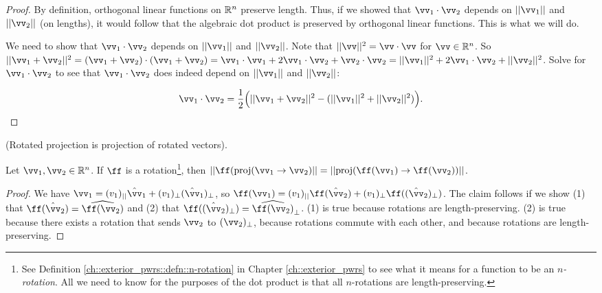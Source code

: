 \begin{proof}
    By definition, orthogonal linear functions on $\mathbb{R}^n$ preserve length. Thus, if we showed that  $\vv_1 \cdot \vv_2$ depends on $||\vv_1||$ and $||\vv_2||$ (on lengths), it would follow that the algebraic dot product is preserved by orthogonal linear functions. This is what we will do.

    We need to show that $\vv_1 \cdot \vv_2$ depends on $||\vv_1||$ and $||\vv_2||$. Note that $||\vv||^2 = \vv \cdot \vv$ for $\vv \in \R^n$. So \\ $||\vv_1 + \vv_2||^2 = (\vv_1 + \vv_2) \cdot (\vv_1 + \vv_2) = \vv_1 \cdot \vv_1 + 2 \vv_1 \cdot \vv_2 + \vv_2 \cdot \vv_2 = ||\vv_1||^2 + 2 \vv_1 \cdot \vv_2 + ||\vv_2||^2$. Solve for $\vv_1 \cdot \vv_2$ to see that $\vv_1 \cdot \vv_2$ does indeed depend on $||\vv_1||$ and $||\vv_2||$:
    
   \begin{align*}
        \vv_1 \cdot \vv_2 = \frac{1}{2}\Big(||\vv_1 + \vv_2||^2 - (||\vv_1||^2 + ||\vv_2||^2) \Big).
    \end{align*}
\end{proof}

\begin{lemma}
    \label{ch::lin_alg::lemma::rotated_projection_length}
        (Rotated projection is projection of rotated vectors). 
        
        Let $\vv_1, \vv_2 \in \R^n$. If $\ff$ is a rotation\footnote{See Definition \ref{ch::exterior_pwrs::defn::n-rotation} in Chapter \ref{ch::exterior_pwrs} to see what it means for a function to be an \textit{$n$-rotation}. All we need to know for the purposes of the dot product is that all $n$-rotations are length-preserving.}, then $||\ff(\proj(\vv_1 \rightarrow \vv_2)|| = ||\proj(\ff(\vv_1) \rightarrow \ff(\vv_2))||$.
    \end{lemma}
    
    \begin{proof}
        We have $\vv_1 = (v_1)_{||} \hat{\vv}_1 + (v_1)_\perp (\hat{\vv}_1)_\perp$, so $\ff(\vv_1) = (v_1)_{||} \ff(\hat{\vv}_2) + (v_1)_\perp \ff((\hat{\vv}_2)_\perp)$. The claim follows if we show (1) that $\ff(\hat{\vv}_2) = \widehat{\ff(\vv_2)}$ and (2) that $\ff((\hat{\vv}_2)_\perp) = \widehat{\ff(\vv_2)}_\perp$. (1) is true because rotations are length-preserving. (2) is true because there exists a rotation that sends $\vv_2$ to $(\vv_2)_\perp$, because rotations commute with each other, and because rotations are length-preserving.
    \end{proof}

